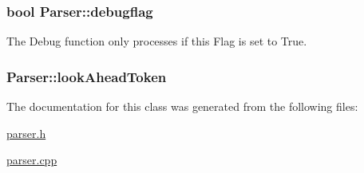 \hypertarget{classParser_a090a56f54cfd45240a039863b8289581}{
\subsubsection[{debugflag}]{\setlength{\rightskip}{0pt plus 5cm}bool {\bf Parser::debugflag}}}
\label{classParser_a090a56f54cfd45240a039863b8289581}


The Debug function only processes if this Flag is set to True. 

\hypertarget{classParser_a4f9e59e89197efefa1feff50f5ea8725}{
\subsubsection[{lookAheadToken}]{ {\bf Parser::lookAheadToken}}}
\label{classParser_a4f9e59e89197efefa1feff50f5ea8725}


The documentation for this class was generated from the following files:\begin{DoxyCompactItemize}
\item 
\hyperlink{parser_8h}{parser.h}\item 
\hyperlink{parser_8cpp}{parser.cpp}\end{DoxyCompactItemize}
